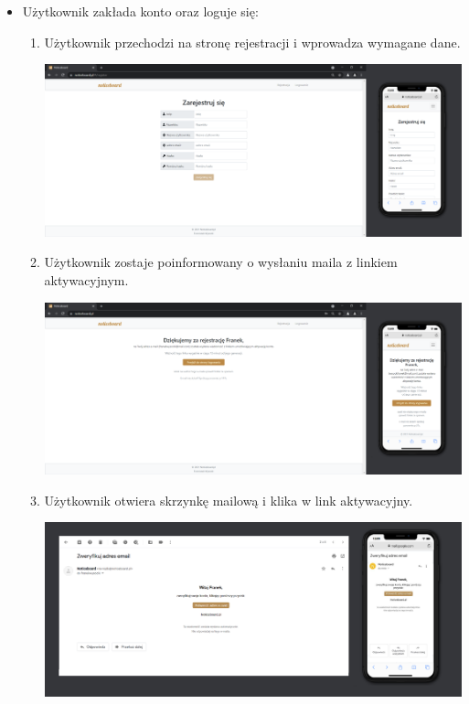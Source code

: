\documentclass{article}
\begin{document}
\begin{itemize}
    \item Użytkownik zakłada konto oraz loguje się:
        \begin{enumerate}
            \item Użytkownik przechodzi na stronę rejestracji i wprowadza wymagane dane.
            \begin{center}
                    \centering  \includegraphics[width=15.5cm]{StronaRejestracji.png}
            \end{center}
            \item Użytkownik zostaje poinformowany o wysłaniu maila z linkiem aktywacyjnym.
            \begin{center}
                    \centering  \includegraphics[width=15.5cm]{StronaPotwierdzeniaRejestracji.png}
            \end{center}
            \item Użytkownik otwiera skrzynkę mailową i klika w link aktywacyjny.
            \begin{center}
                    \centering  \includegraphics[width=15.5cm]{Mail.png}

\end{center}
\end{enumerate}
\end{itemize}
\end{document}
